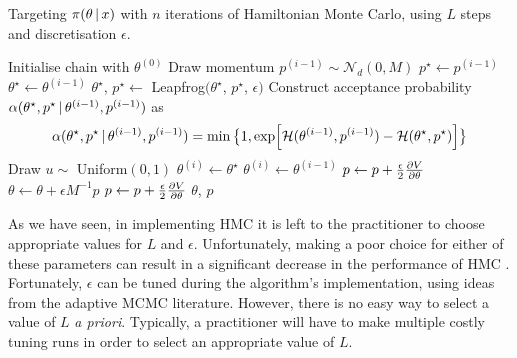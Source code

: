 \begin{algorithm}[tb]
  \caption{Targeting $\pi(\theta \,|\, x)$ with $n$ iterations of Hamiltonian Monte
  Carlo, using $L$ steps and discretisation $\epsilon$.}
  \label{alg:hmc}
  \begin{algorithmic}[1]
    \State Initialise chain with $\theta^{(0)}$
      \State Draw momentum $p^{(i-1)} \sim \mathcal{N}_d(0, M)$
      \State $p^\star \leftarrow p^{(i-1)}$
      \State $\theta^\star \leftarrow\theta^{(i-1)}$
      \State {}
        \State $\theta^\star$, $p^\star \leftarrow$ Leapfrog$(\theta^\star$,
                                                             $p^\star$, $\epsilon)$
      \EndFor
      \State Construct acceptance probability $\alpha(\theta^\star, p^\star \,|\,
                                               \theta^{(i-1)}, p^{(i-1)})$ as
        \begin{equation*}
            \alpha(\theta^\star, p^\star \,|\,\theta^{(i-1)}, p^{(i-1)}) =
            \min\big\{1, \exp[\mathcal{H}(\theta^{(i-1)}, p^{(i-1)}) -
                              \mathcal{H}(\theta^\star, p^\star)]
                  \big\}
        \end{equation*}
      \State Draw $u \sim$ Uniform$(0, 1)$
        \State {}
        \State $\theta^{(i)} \leftarrow\theta^\star$
      \Else
        \State {}
        \State $\theta^{(i)} \leftarrow\theta^{(i-1)}$
      \EndIf
    \EndFor
  \State
    \State $p \leftarrow p + \frac{\epsilon}{2} \pdv{V}{\theta}$
    \State $\theta \leftarrow \theta + \epsilon M^{-1} p$
    \State $p \leftarrow p + \frac{\epsilon}{2} \pdv{V}{\theta}$
    \State \Return $\theta$, $p$
  \EndProcedure
  \end{algorithmic}
\end{algorithm}

As we have seen, in implementing HMC it is left to the practitioner to choose appropriate
values for $L$ and $\epsilon$. Unfortunately, making a poor choice for either of these
parameters can result in a significant decrease in the performance of HMC
\parencite{hoffman14}. Fortunately, $\epsilon$ can be tuned during the algorithm's
implementation, using ideas from the adaptive MCMC literature. However, there is no easy
way to select a value of $L$ \emph{a priori}. Typically, a practitioner will have to make
multiple costly tuning runs in order to select an appropriate value of $L$.


